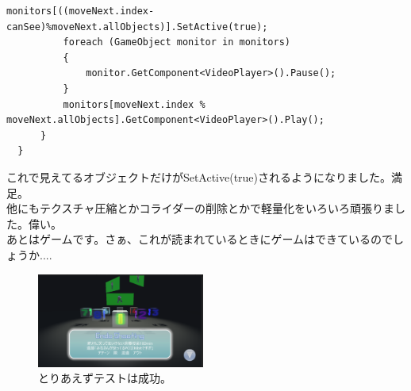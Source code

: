 \documentclass[b5paper,9pt,platex,dvipdfmx]{jsarticle}
\begin{document}
\begin{multicols*}{3}
\begin{lstlisting}[caption=Monitor.cs]
          monitors[((moveNext.index-canSee)%moveNext.allObjects)].SetActive(true);
          foreach (GameObject monitor in monitors)
          {
              monitor.GetComponent<VideoPlayer>().Pause();
          }
          monitors[moveNext.index % moveNext.allObjects].GetComponent<VideoPlayer>().Play();
      }
  }
\end{lstlisting}
これで見えてるオブジェクトだけがSetActive(true)されるようになりました。満足。\\
他にもテクスチャ圧縮とかコライダーの削除とかで軽量化をいろいろ頑張りました。偉い。\\
あとはゲームです。さぁ、これが読まれているときにゲームはできているのでしょうか....\\
\begin{figure}[H]
  \centering
  \includegraphics[width=5.5cm]{7.png}
  \caption{とりあえずテストは成功。}
\end{figure}

\end{multicols*}
\end{document}
